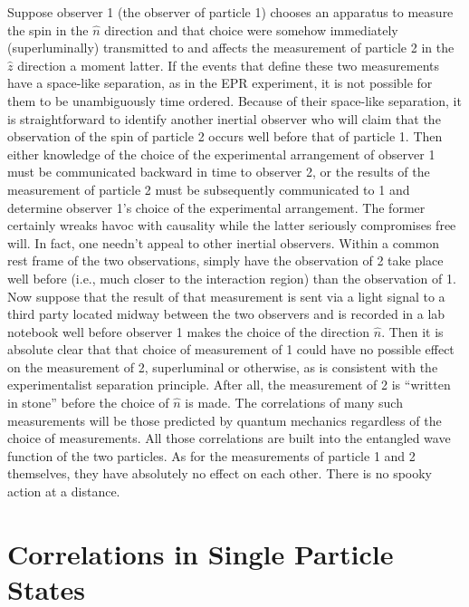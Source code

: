 \documentclass[12pt]{article}
\begin{document}
Suppose observer 1 (the observer of particle 1) chooses an apparatus to measure the spin in the $\hat{n}$ direction and that choice were somehow immediately (superluminally) transmitted to and affects the measurement of particle 2 in the $\hat{z}$ direction a moment latter. If the events that define these two measurements have a space-like separation, as in the EPR experiment, it is not possible for them to be unambiguously time ordered. Because of their space-like separation, it is straightforward to identify another inertial observer who will claim that the observation of the spin of particle 2 occurs well before that of particle 1. Then either knowledge of the choice of the experimental arrangement of observer 1 must be communicated backward in time to observer 2, or the results of the measurement of particle 2 must be subsequently communicated to 1 and determine observer 1's choice of the experimental arrangement. The former certainly wreaks havoc with causality while the latter seriously compromises free will. In fact, one needn't appeal to other inertial observers. Within a common rest frame of the two observations, simply have the observation of 2 take place well before (i.e., much closer to the interaction region) than the observation of 1. Now suppose that the result of that measurement is sent via a light signal to a third party located midway between the two observers and is recorded in a lab notebook well before observer 1 makes the choice of the direction $\hat{n}$. Then it is absolute clear that that choice of measurement of 1 could have no possible effect on the measurement of 2, superluminal or otherwise, as is consistent with the experimentalist separation principle. After all, the measurement of 2 is ``written in stone'' before the choice of $\hat{n}$ is made. The correlations of many such measurements will be those predicted by quantum mechanics regardless of the choice of measurements. All those correlations are built into the entangled wave function of the two particles. As for the measurements of particle 1 and 2 themselves, they have absolutely no effect on each other. There is no spooky action at a distance.

\section{Correlations in Single Particle States}\label{prob}
\end{document}
